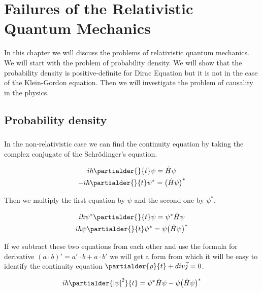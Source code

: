\chapter{Failures of the Relativistic Quantum Mechanics}

In this chapter we will discuss the problems of relativistic quantum mechanics. We will start
with the problem of probability density. We will show that the probability density is positive-definite for Dirac Equation
but it is not in the case of the Klein-Gordon equation. Then we will investigate the problem of causality
in the physics.

\section{Probability density}

\paragraph{} In the non-relativistic case we can find the continuity equation by taking the complex conjugate
of the Schrödinger's equation.

\begin{equation*}
    \begin{gathered}
        i \hbar \partialder{}{t} \psi = \hat{H} \psi \\
        - i \hbar \partialder{}{t} \psi^{*} = \big(\hat{H} \psi \big)^{*}
    \end{gathered}
\end{equation*}

Then we multiply the first equation by $\psi$ and the second one by $\psi^{*}$.

\begin{equation*}
    \begin{gathered}
        i \hbar \psi^{*} \partialder{}{t} \psi = \psi^{*} \hat{H} \psi \\
        i \hbar \psi \partialder{}{t} \psi^{*} = \psi \big(\hat{H} \psi \big)^{*}
    \end{gathered}
\end{equation*}

If we subtract these two equations from each other and use the formula for derivative $(a \cdot b)' = a' \cdot b + a \cdot b'$
we will get a form from which it will be easy to identify the continuity equation $\partialder{\rho}{t} + div \vec{j} = 0$.

\begin{equation*}
    i \hbar \partialder{\left|\psi\right|^{2}}{t}  = \psi^{*} \hat{H} \psi - \psi \big(\hat{H} \psi \big)^{*}
\end{equation*}

